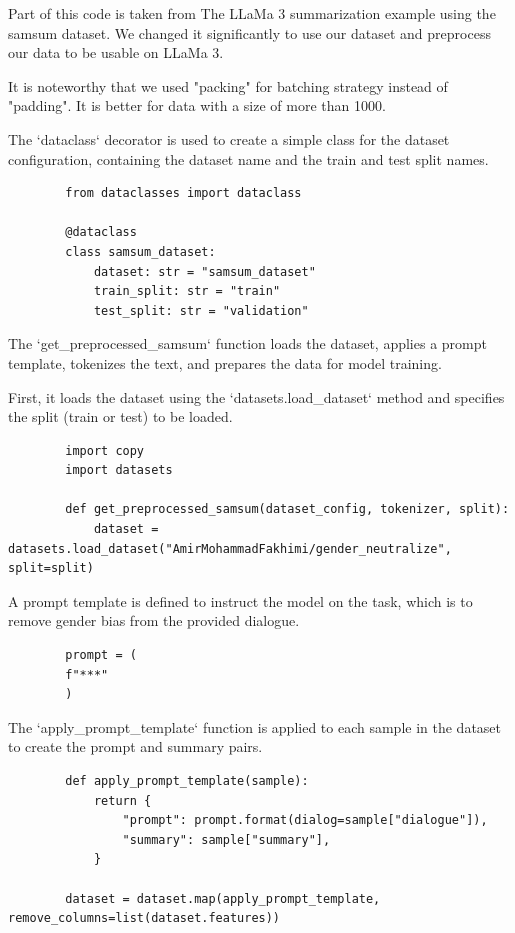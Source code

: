 \documentclass{solutionclass} %
\begin{document}
Part of this code is taken from The LLaMa 3 summarization example using the samsum dataset. We changed it significantly to use our dataset and preprocess our data to be usable on LLaMa 3.

It is noteworthy that we used "packing" for batching strategy instead of "padding". It is better for data with a size of more than 1000.



\begin{solution}
	The `dataclass` decorator is used to create a simple class for the dataset configuration, containing the dataset name and the train and test split names.
	\begin{lstlisting}
		from dataclasses import dataclass
		
		@dataclass
		class samsum_dataset:
			dataset: str = "samsum_dataset"
			train_split: str = "train"
			test_split: str = "validation"
		\end{lstlisting}
\end{solution}

\begin{solution}
	The `get\_preprocessed\_samsum` function loads the dataset, applies a prompt template, tokenizes the text, and prepares the data for model training.
	
	First, it loads the dataset using the `datasets.load\_dataset` method and specifies the split (train or test) to be loaded.
	\begin{lstlisting}
		import copy
		import datasets
		
		def get_preprocessed_samsum(dataset_config, tokenizer, split):
			dataset = datasets.load_dataset("AmirMohammadFakhimi/gender_neutralize", split=split)
		\end{lstlisting}
\end{solution}

\begin{solution}
	A prompt template is defined to instruct the model on the task, which is to remove gender bias from the provided dialogue.
	\begin{lstlisting}
		prompt = (
		f"***"
		)
	\end{lstlisting}
\end{solution}

\begin{solution}
	The `apply\_prompt\_template` function is applied to each sample in the dataset to create the prompt and summary pairs.
	\begin{lstlisting}
		def apply_prompt_template(sample):
			return {
				"prompt": prompt.format(dialog=sample["dialogue"]),
				"summary": sample["summary"],
			}
		
		dataset = dataset.map(apply_prompt_template, remove_columns=list(dataset.features))
		\end{lstlisting}
\end{solution}
\end{document}
